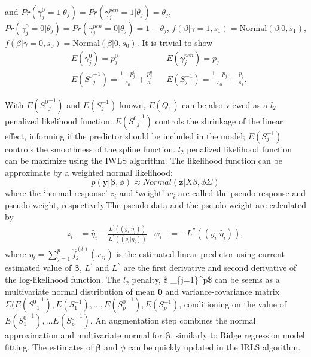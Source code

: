 \documentclass[AMA,STIX1COL,]{WileyNJD-v2}
\begin{document}
and
\(Pr(\gamma_{j}^{0} = 1|\theta_j) =Pr(\gamma_{j}^{pen} = 1|\theta_j) = \theta_j\),
\(Pr(\gamma_{j}^{0} = 0|\theta_j) = Pr(\gamma_{j}^{pen} = 0|\theta_j) = 1-\theta_j\),
\(f(\beta|\gamma=1, s_1) = \text{Normal}(\beta|0 , s_1)\),
\(f(\beta|\gamma=0, s_0) = \text{Normal}(\beta|0 , s_0)\). It is trivial
to show \[
\begin{aligned}
&E(\gamma^0_{j})  = p^0_{j} & &E(\gamma^{pen}_{j})  = p_{j}\\
&E({S^0}^{-1}_{j}) = \frac{1-p^{0}_{j}}{s_0} + \frac{p^{0}_{j}}{s_1} & &E(S^{-1}_{j}) = \frac{1-p_{j}}{s_0} + \frac{p_{j}}{s_1}.
\end{aligned}
\]

With \(E({S^0}^{-1}_{j})\) and \(E(S^{-1}_{j})\) known, \(E(Q_1)\) can
be also viewed as a \(l_2\) penalized likelihood function:
\(E({S^0}^{-1}_{j})\) controls the shrinkage of the linear effect,
informing if the predictor should be included in the model;
\(E(S^{-1}_{j})\) controls the smoothness of the spline function.
\(l_2\) penalized likelihood function can be maximize using the IWLS
algorithm. The likelihood function can be approximate by a weighted
normal likelihood: \[
  p(\textbf{y}|\boldsymbol{\beta}, \phi) \approx Normal(\textbf{z}|X\beta, \phi\Sigma)
\] where the `normal response' \(z_i\) and `weight' \(w_i\) are called
the pseudo-response and pseudo-weight, respectively.The pseudo data and
the pseudo-weight are calculated by \[
    \begin{aligned}
    z_i &= \hat\eta_i - \frac{L^{'}((y_i|\hat\eta_i))}{L^{''}((y_i|\hat\eta_i))}& w_i &= - L^{''}((y_i|\hat\eta_i)),
    \end{aligned}
    \] where \(\eta_i = \sum\limits_{j=1}^p \hat f_j^{(t)}(x_{ij})\) is
the estimated linear predictor using current estimated value of
\(\boldsymbol{\beta}\), \(L^{'}\) and \(L^{''}\) are the first
derivative and second derivative of the log-likelihood function. The
\(l_2\) penalty, \$
\sum\limits\_\{j=1\}\^{}p\left[E({S^0_j}^{-1}){\beta^0_j}^2+\sum\limits_{k=1}^{K_j}E(S^{-1}_{j})\beta_{jk}^2\right]\$
can be seems as a multivariate normal distribution of mean
\(\textbf{0}\) and variance-covariance matrix
\(\Sigma(E({S^0}_1^{-1}), E(S_1^{-1}), \dots, E({S_p^0}^{-1}), E(S_p^{-1})\),
conditioning on the value of \(E({S^0_1}^{-1}), \dots E({S^0_p}^{-1})\).
An augmentation step combines the normal approximation and multivariate
normal for \(\boldsymbol{\beta}\), similarly to Ridge regression model
fitting. The estimates of \(\boldsymbol{\beta}\) and \(\phi\) can be
quickly updated in the IRLS algorithm.
\end{document}
